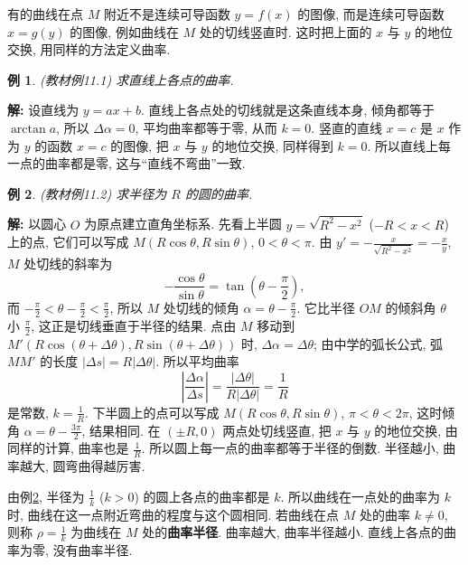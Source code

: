 \documentclass[UTF8,openany]{ctexbook}
\theoremstyle{chinesetextbook}
\newtheorem{example}{例}[section]
\newenvironment{cnsolution}{\par\indent\textbf{解:} \ignorespaces}{\par}
\begin{document}
有的曲线在点 $M$ 附近不是连续可导函数 $y=f(x)$ 的图像, 而是连续可导函数 $x=g(y)$ 的图像, 例如曲线在 $M$ 处的切线竖直时. 这时把上面的 $x$ 与 $y$ 的地位交换, 用同样的方法定义曲率.
\begin{example}\label{ex:c2-11-1}
\textnormal{(教材例11.1)} 求直线上各点的曲率.
\end{example}
\begin{cnsolution}
设直线为 $y=ax+b$. 直线上各点处的切线就是这条直线本身, 倾角都等于 $\arctan a$, 所以 $\Delta\alpha=0$, 平均曲率都等于零, 从而 $k=0$. 竖直的直线 $x=c$ 是 $x$ 作为 $y$ 的函数 $x=c$ 的图像, 把 $x$ 与 $y$ 的地位交换, 同样得到 $k=0$. 所以直线上每一点的曲率都是零, 这与“直线不弯曲”一致.
\end{cnsolution}
\begin{example}\label{ex:c2-11-2}
\textnormal{(教材例11.2)} 求半径为 $R$ 的圆的曲率.
\end{example}
\begin{cnsolution}
以圆心 $O$ 为原点建立直角坐标系. 先看上半圆 $y=\sqrt{R^2-x^2}$ ($-R<x<R$) 上的点, 它们可以写成 $M(R\cos\theta,R\sin\theta)$, $0<\theta<\pi$. 由 $\displaystyle y'=-\frac x{\sqrt{R^2-x^2}}=-\frac xy$, $M$ 处切线的斜率为
\[
-\frac{\cos\theta}{\sin\theta}=\tan\left(\theta-\frac\pi2\right),
\]
而 $\displaystyle-\frac\pi2<\theta-\frac\pi2<\frac\pi2$, 所以 $M$ 处切线的倾角 $\displaystyle\alpha=\theta-\frac\pi2$. 它比半径 $OM$ 的倾斜角 $\theta$ 小 $\displaystyle\frac\pi2$, 这正是切线垂直于半径的结果. 点由 $M$ 移动到 $M'(R\cos(\theta+\Delta\theta),R\sin(\theta+\Delta\theta))$ 时, $\Delta\alpha=\Delta\theta$; 由中学的弧长公式, 弧 $MM'$ 的长度 $|\Delta s|=R|\Delta\theta|$. 所以平均曲率
\[
\left|\frac{\Delta\alpha}{\Delta s}\right|=\frac{|\Delta\theta|}{R|\Delta\theta|}=\frac1R
\]
是常数, $\displaystyle k=\frac1R$. 下半圆上的点可以写成 $M(R\cos\theta,R\sin\theta)$, $\pi<\theta<2\pi$, 这时倾角 $\displaystyle\alpha=\theta-\frac{3\pi}2$, 结果相同. 在 $(\pm R,0)$ 两点处切线竖直, 把 $x$ 与 $y$ 的地位交换, 由同样的计算, 曲率也是 $\displaystyle\frac1R$. 所以圆上每一点的曲率都等于半径的倒数. 半径越小, 曲率越大, 圆弯曲得越厉害.
\end{cnsolution}
由例\ref{ex:c2-11-2}, 半径为 $\displaystyle\frac1k$ ($k>0$) 的圆上各点的曲率都是 $k$. 所以曲线在一点处的曲率为 $k$ 时, 曲线在这一点附近弯曲的程度与这个圆相同. 若曲线在点 $M$ 处的曲率 $k\ne0$, 则称 $\displaystyle\rho=\frac1k$ 为曲线在 $M$ 处的\textbf{曲率半径}. 曲率越大, 曲率半径越小. 直线上各点的曲率为零, 没有曲率半径.
\end{document}
